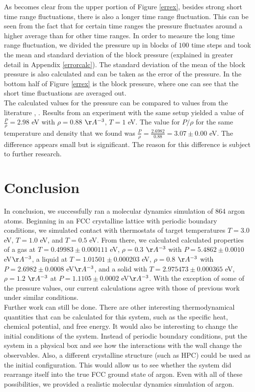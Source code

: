 \documentclass{article}
\begin{document}
\begin{multicols}{2}
As becomes clear from the upper portion of Figure \ref{errex}, besides strong short time range fluctuations, there is also a longer time range fluctuation.  This can be seen from the fact that for certain time ranges the pressure fluctuates around a higher average than for other time ranges.  In order to measure the long time range fluctuation, we divided the pressure up in blocks of $100$ time steps and took the mean and standard deviation of the block pressure (explained in greater detail in Appendix \ref{errorcalc}).  The standard deviation of the mean of the block pressure is also calculated and can be taken as the error of the pressure.  In the bottom half of Figure \ref{errex} is the block pressure, where one can see that the short time fluctuations are averaged out.\\

The calculated values for the pressure can be compared to values from the literature \cite{thijssen}, \cite{verlet}. Results from an experiment with the same setup yielded a value of $\frac{P}{\rho} = 2.98$ eV with $\rho = 0.88$ $\AA ^{-3}$, $T = 1$ eV. The value for $P/\rho$ for the same temperature and density that we found was $\frac{P}{\rho} = \frac{2.6982}{0.88} = 3.07 \pm 0.00 $ eV.  The difference appears small but is significant. The reason for this difference is subject to further research.

\section{Conclusion}
\label{conc}

In conclusion, we successfully ran a molecular dynamics simulation of 864 argon atoms.  Beginning in an FCC crystalline lattice with periodic boundary conditions, we simulated contact with thermostats of target temperatures $T=3.0$ eV, $T=1.0$ eV, and $T=0.5$ eV.  From there, we calculated calculated properties of a gas at $T=0.49983 \pm 0.000111$ eV, $\rho=0.3$ $\AA ^{-3}$ with $P=5.4862 \pm 0.0010 $ eV$\AA^{-3}$, a liquid at $T= 1.01501 \pm 0.000203$ eV, $\rho =0.8$ $\AA ^{-3}$ with $P=2.6982 \pm 0.0008$ eV$\AA^{-3}$, and a solid with $T=2.975473 \pm 0.000365$  eV, $\rho=1.2$ $\AA ^{-3}$ at $P=1.1105 \pm 0.0002 $ eV$\AA^{-3}$.  With the exception of some of the pressure values, our current calculations agree with those of previous work under similar conditions.  \\

Further work can still be done.  There are other interesting thermodynamical quantities that can be calculated for this system, such as the specific heat, chemical potential, and free energy.  It would also be interesting to change the initial conditions of the system.  Instead of periodic boundary conditions, put the system in a physical box and see how the interactions with the wall change the observables.  Also, a different crystalline structure (such as HPC) could be used as the initial configuration.  This would allow us to see whether the system did rearrange itself into the true FCC ground state of argon.  Even with all of these possibilities, we provided a realistic molecular dynamics simulation of argon.  


\end{multicols}
\end{document}
